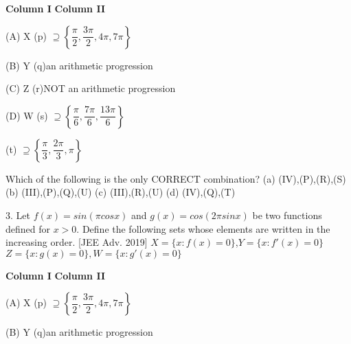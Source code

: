 \documentclass[journal,12pt,twocolumn]{IEEEtran}
\theoremstyle{remark}
\begin{document}
\textbf{Column I}  \hspace{2cm}\textbf{Column II}
\newline

(A) X \hspace{42pt} (p) $\supseteq \left\{ \dfrac{\pi}{2}, \dfrac{3\pi}{2}, 4\pi, 7\pi \right\}$


(B) Y \hspace{42pt} (q)an arithmetic progression
\newline

(C) Z \hspace{45pt} (r)NOT an arithmetic progression
\newline

(D) W\hspace{45pt}  (s) $\supseteq\left\{\dfrac{\pi}{6},\dfrac{7\pi}{6},\dfrac{13\pi}{6}\right\}$
\newline

\hspace{75pt} (t) $\supseteq\left\{\dfrac{\pi}{3},\dfrac{2\pi}{3},\pi\right\}$
\newline

Which of the following is the only CORRECT combination?
\newline
(a) (IV),(P),(R),(S) \hspace{50pt} (b) (III),(P),(Q),(U)\newline
(c) (III),(R),(U) \hspace{65pt} (d) (IV),(Q),(T)
\newline

3. Let $f(x)=sin(\pi cosx)$ and $g(x)=cos(2\pi sinx)$ be two functions defined for $x>0$. Define the following sets whose elements are written in the increasing order.\hspace{80pt} [JEE Adv. 2019]
\newline\newline$X=\{x:f(x)=0\}$,$Y=\{x:f'(x)=0\}$\newline
$Z=\{x:g(x)=0\}, W=\{x:g'(x)=0\}$
\newline

\textbf{Column I}  \hspace{2cm}\textbf{Column II}
\newline

(A) X \hspace{42pt} (p)  $\supseteq\left\{\dfrac{\pi}{2},\dfrac{3\pi}{2},4\pi,7\pi\right\}$
\newline

(B) Y \hspace{42pt} (q)an arithmetic progression
\newline
\end{document}
